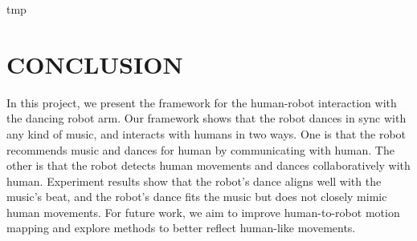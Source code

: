 \documentclass[letterpaper, 10 pt, conference]{ieeeconf}  %
\begin{document}
tmp



\section{CONCLUSION}
In this project, we present the framework for the human-robot interaction with the dancing robot arm. Our framework shows that the robot dances in sync with any kind of music, and interacts with humans in two ways. One is that the robot recommends music and dances for human by communicating with human. The other is that the robot detects human movements and dances collaboratively with human. Experiment results show that the robot's dance aligns well with the music's beat, and the robot's dance fits the music but does not closely mimic human movements. For future work, we aim to improve human-to-robot motion mapping and explore methods to better reflect human-like movements.



\end{document}
